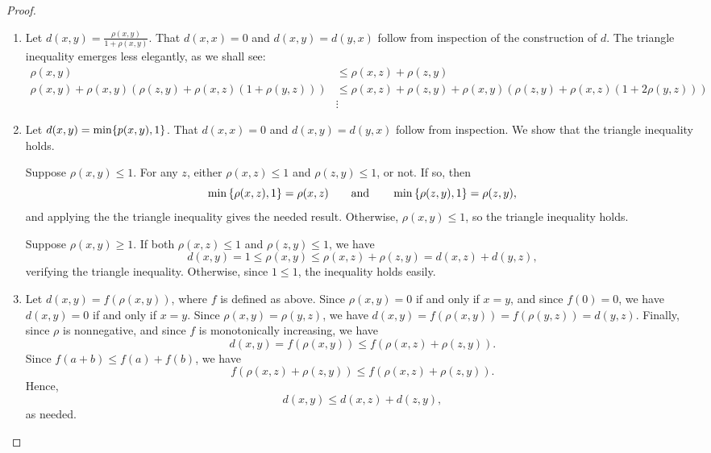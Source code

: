 \begin{proof}
    \begin{enumerate}
        \item Let $d(x,y) = \frac{\rho(x,y)}{1 + \rho(x,y)}$. That $d(x,x) = 0$
            and $d(x, y) = d(y, x)$ follow from inspection of the construction
            of $d$. The triangle inequality emerges less elegantly, as we shall
            see:
            \begin{align*}
                \rho(x, y) &\leq \rho(x, z) + \rho(z, y) \\
                \rho(x, y) + \rho(x, y) (\rho(z, y) + \rho(x, z) (1 + \rho(y,
                z)))
                &\leq
                \rho(x, z) + \rho(z, y) + \rho(x, y) (\rho(z, y) + \rho(x, z) (1
                + 2\rho(y, z))) \\
                &\vdots
            \end{align*}
        \item Let $d(x,y) = \min\{p(x,y), 1\}$. That $d(x,x) = 0$ and $d(x,y)
            = d(y,x)$ follow from inspection. We show that the triangle
            inequality holds. 

            Suppose $\rho(x,y) \leq 1$. For any $z$, either $\rho(x,z) \leq 1$ and
            $\rho(z, y) \leq 1$, or not. If so, then
            \[
                \min{\{\rho(x,z), 1\}} = \rho(x,z) \qquad \text{and} \qquad
                \min{\{\rho(z,y), 1\}} = \rho(z,y),
            \]
            and applying the the triangle inequality gives the needed result.
            Otherwise, $\rho(x,y) \leq 1$, so the triangle inequality holds. 

            Suppose $\rho(x, y) \geq 1$. If both $\rho(x,z) \leq 1$ and
            $\rho(z,y) \leq 1$, we have
            \[
                d(x,y) = 1 \leq  \rho(x,y) \leq \rho(x,z) + \rho(z, y) = d(x,z)
                + d(y,z),
            \]
            verifying the triangle inequality. Otherwise, since $1 \leq 1$, the
            inequality holds easily.
        \item Let $d(x, y) = f(\rho(x,y))$, where $f$ is defined as above.
            Since $\rho(x, y) = 0$ if and only if $x = y$, and since $f(0) = 0$,
            we have $d(x, y) = 0$ if and only if $x = y$. Since $\rho(x, y) =
            \rho(y, z)$, we have $d(x,y) = f(\rho(x,y)) = f(\rho(y,z)) =
            d(y,z)$. Finally, since $\rho$ is nonnegative, and since $f$ is
            monotonically increasing, we have 
            \[
                d(x,y) = f(\rho(x, y)) \leq f(\rho(x,z) + \rho(z,y)).
            \]
            Since $f(a + b) \leq f(a) + f(b)$, we have
            \[
                f(\rho(x, z) + \rho(z, y)) \leq f(\rho(x,z) + \rho(z, y)).
            \]
            Hence,
            \[
                d(x,y) \leq d(x, z) + d(z, y),
            \]
            as needed.
    \end{enumerate}
\end{proof}

